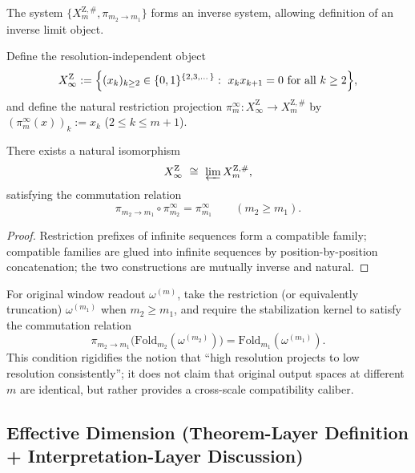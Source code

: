 The system $\{X_m^{\mathrm Z,\#},\pi_{m_2\to m_1}\}$ forms an inverse system, allowing definition of an inverse limit object.

\begin{definition}\label{def:XinfZ-multiscale}
Define the resolution-independent object
\[
X_\infty^{\mathrm Z}:=\Bigl\{(x_k)_{k\ge 2}\in\{0,1\}^{\{2,3,\dots\}}:\ x_kx_{k+1}=0\ \text{for all}\ k\ge 2\Bigr\},
\]
and define the natural restriction projection $\pi_m^\infty:X_\infty^{\mathrm Z}\to X_m^{\mathrm Z,\#}$ by $(\pi_m^\infty(x))_k:=x_k$ ($2\le k\le m+1$).
\end{definition}

\begin{theorem}\label{thm:multiscale-inverse-limit}
There exists a natural isomorphism
\[
X_\infty^{\mathrm Z}\ \cong\ \varprojlim X_m^{\mathrm Z,\#},
\]
satisfying the commutation relation
\[
\pi_{m_2\to m_1}\circ \pi_{m_2}^\infty=\pi_{m_1}^\infty\qquad(m_2\ge m_1).
\]
\end{theorem}

\begin{proof}
Restriction prefixes of infinite sequences form a compatible family; compatible families are glued into infinite sequences by position-by-position concatenation; the two constructions are mutually inverse and natural.
\end{proof}

\begin{assumption}\label{assump:scale-compatibility}
For original window readout $\omega^{(m)}$, take the restriction (or equivalently truncation) $\omega^{(m_1)}$ when $m_2\ge m_1$, and require the stabilization kernel to satisfy the commutation relation
\[
\pi_{m_2\to m_1}\bigl(\mathrm{Fold}_{m_2}(\omega^{(m_2)})\bigr)=\mathrm{Fold}_{m_1}(\omega^{(m_1)}).
\]
This condition rigidifies the notion that ``high resolution projects to low resolution consistently''; it does not claim that original output spaces at different $m$ are identical, but rather provides a cross-scale compatibility caliber.
\end{assumption}

\subsection{Effective Dimension (Theorem-Layer Definition + Interpretation-Layer Discussion)}

